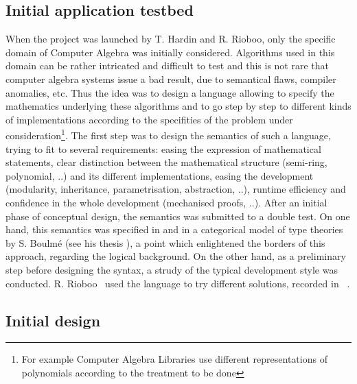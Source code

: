 \subsection*{Initial application testbed}

 When the {\foc} project was launched by T. Hardin and R. Rioboo,
only the specific domain of Computer Algebra was initially considered.
Algorithms used in this domain can be rather intricated and
difficult to test and this is not rare that computer algebra systems
issue a bad result, due to semantical flaws, compiler anomalies,
etc. Thus the idea was to design a language allowing to specify the
mathematics underlying these algorithms and to go step by step to
different kinds of implementations according to the specifities of the
problem under consideration\footnote{For example Computer Algebra
Libraries use different representations of polynomials
according to the treatment to be done}. The first step was to design
the semantics of such a language, trying to fit to several
requirements: easing the expression of mathematical statements, clear
distinction between the mathematical structure (semi-ring, polynomial,
..)  and its different implementations, easing the development
(modularity, inheritance, parametrisation, abstraction, ..), runtime
efficiency and confidence in the whole development (mechanised proofs,
..).  After an initial phase of conceptual design, the {\foc}
semantics was submitted to a double test. On one hand, this semantics
was specified in {\coq} and in a categorical model of type theories by
S. Boulm\'e (see his thesis \cite{BoulmePhD00}), a point which
enlightened the borders of this approach, regarding the logical %
background. On the other hand, as a preliminary step before designing the syntax,
a strudy of the typical development style was conducted.
R. Rioboo~\cite{ThRRCalculemus,HardinRiobooTSI04} used the
{\ocaml} language to try different solutions, recorded in
~\cite{HardinRiobooTSI04}.

\subsection*{Initial {\oldfocal} design}

